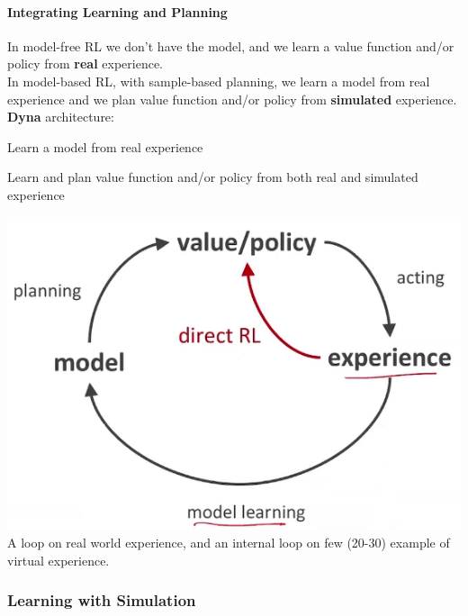 \documentclass[10pt]{report}
\begin{document}
\paragraph{Integrating Learning and Planning} In model-free RL we don't have the model, and we learn a value function and/or policy from \textbf{real} experience.\\
In model-based RL, with sample-based planning, we learn a model from real experience and we plan value function and/or policy from \textbf{simulated} experience.\\
\textbf{Dyna} architecture:
\begin{list}{}{}
	\item Learn a model from real experience
	\item Learn and plan value function and/or policy from both real and simulated experience
\end{list}
\begin{center}
	\includegraphics[scale=0.4]{185.png}\\
A loop on real world experience, and an internal loop on few (20-30) example of virtual experience.
\end{center}
\subsubsection{Learning with Simulation}
\end{document}
